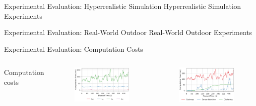 \documentclass{beamer}
\begin{document}
    \begin{frame}{Experimental Evaluation: Hyperrealistic Simulation}
        Hyperrealistic Simulation Experiments
    \end{frame}

    \begin{frame}{Experimental Evaluation: Real-World Outdoor}
        Real-World Outdoor Experiments
    \end{frame}

    \begin{frame}{Experimental Evaluation: Computation Costs}
        \begin{columns}[c,onlytextwidth]
                Computation costs

                \vspace{0.4cm}
                \begin{figure}
                    \centering
                    \includegraphics[width=\textwidth]{images/Fig8a.png}
                \end{figure}
                \vspace{-0.8cm}
                \begin{figure}
                    \centering
                    \includegraphics[width=\textwidth]{images/Fig8b.png}
                \end{figure}
        \end{columns}
    \end{frame}
\end{document}
